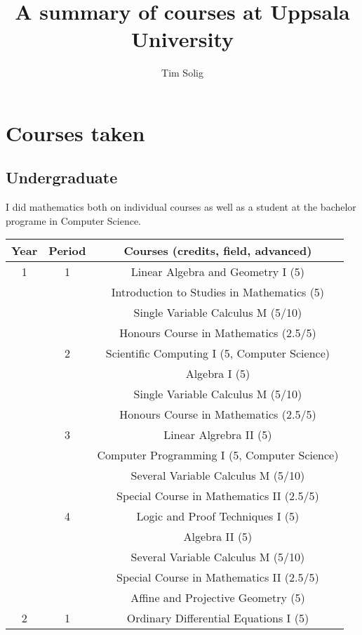 \documentclass{article}
\title{A summary of courses at Uppsala University}
\author{Tim Solig}
\begin{document}
  
  \maketitle

  \section{Courses taken}

  \subsection{Undergraduate}
  I did mathematics both on individual courses as well as a student at the bachelor programe in Computer Science.

  \begin{longtable}{|c|c|c|}
    \hline
    Year & Period & Courses (credits, field, advanced) \\
    \hline
    1 & 1 & Linear Algebra and Geometry I (5) \\
      &   & Introduction to Studies in Mathematics (5) \\
      &   & Single Variable Calculus M (5/10) \\
      &   & Honours Course in Mathematics (2.5/5) \\
    \hline
      & 2 & Scientific Computing I (5, Computer Science) \\
      &   & Algebra I (5) \\
      &   & Single Variable Calculus M (5/10) \\
      &   & Honours Course in Mathematics (2.5/5) \\
    \hline
      & 3 & Linear Algrebra II (5) \\
      &   & Computer Programming I (5, Computer Science) \\
      &   & Several Variable Calculus M (5/10) \\
      &   & Special Course in Mathematics II (2.5/5) \\
    \hline
      & 4 & Logic and Proof Techniques I (5) \\
      &   & Algebra II (5) \\
      &   & Several Variable Calculus M (5/10) \\
      &   & Special Course in Mathematics II (2.5/5) \\
      &   & Affine and Projective Geometry (5) \\
    \hline
    2 & 1 & Ordinary Differential Equations I (5) \\

\end{longtable}
\end{document}

